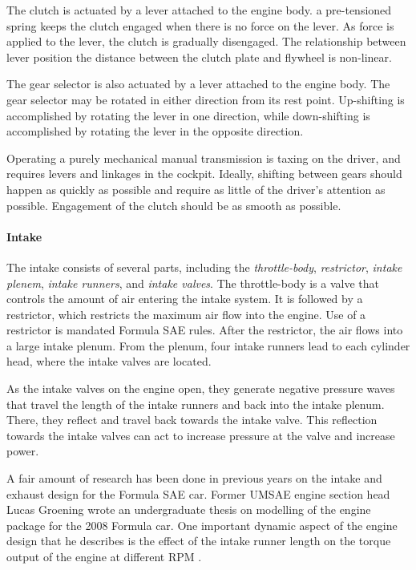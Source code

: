The clutch is actuated by a lever attached to the engine body. a pre-tensioned spring keeps the clutch engaged when there is no force on the lever. As force is applied to the lever, the clutch is gradually disengaged. The relationship between lever position the distance between the clutch plate and flywheel is non-linear. 

The gear selector is also actuated by a lever attached to the engine body. The gear selector may be rotated in either direction from its rest point. Up-shifting is accomplished by rotating the lever in one direction, while down-shifting is accomplished by rotating the lever in the opposite direction. 

Operating a purely mechanical manual transmission is taxing on the driver, and requires levers and linkages in the cockpit. Ideally, shifting between gears should happen as quickly as possible and require as little of the driver's attention as possible. Engagement of the clutch should be as smooth as possible. 

\paragraph{Intake}

The intake consists of several parts, including the \emph{throttle-body}, \emph{restrictor}, \emph{intake plenem}, \emph{intake runners}, and \emph{intake valves}. The throttle-body is a valve that controls the amount of air entering the intake system. It is followed by a restrictor, which restricts the maximum air flow into the engine. Use of a restrictor is mandated Formula SAE rules. After the restrictor, the air flows into a large intake plenum. From the plenum, four intake runners lead to each cylinder head, where the intake valves are located.

As the intake valves on the engine open, they generate negative pressure waves that travel the length of the intake runners and back into the intake plenum. There, they reflect and travel back towards the intake valve. This reflection towards the intake valves can act to increase pressure at the valve and increase power.

A fair amount of research has been done in previous years on the intake and exhaust design for the Formula SAE car. Former UMSAE engine section head Lucas Groening wrote an undergraduate thesis on modelling of the engine package for the 2008 Formula car. One important dynamic aspect of the engine design that he describes is the effect of the intake runner length on the torque output of the engine at different RPM \cite{Modelingof20}. 

